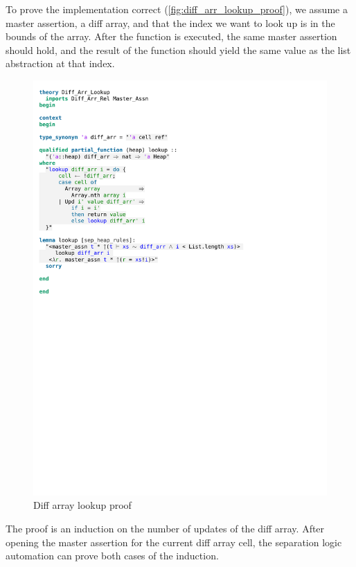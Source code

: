 \noindent To prove the implementation correct (\autoref{fig:diff_arr_lookup_proof}), we assume a master assertion, a diff array, and that the index we want to look up is in the bounds of the array. After the function is executed, the same master assertion should hold, and the result of the function should yield the same value as the list abstraction at that index.

\begin{figure}[htpb]
    \includegraphics[trim={0 16,6cm 0 11,2cm}, clip, width=1.00\textwidth]{figures/Theory_Diff_Arr_Lookup.pdf}
    \caption[Diff array lookup proof]{Diff array lookup proof}
    \label{fig:diff_arr_lookup_proof}
\end{figure}

\noindent The proof is an induction on the number of updates of the diff array. After opening the master assertion for the current diff array cell, the separation logic automation can prove both cases of the induction.

